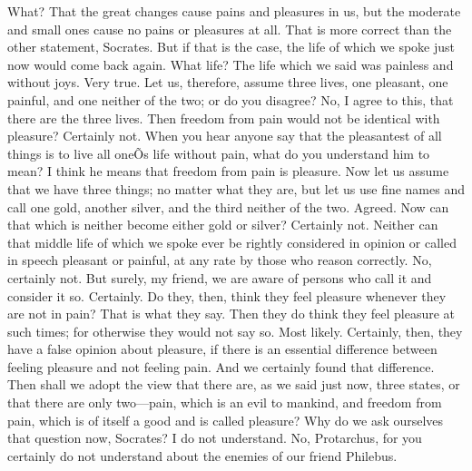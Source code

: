 \documentclass[letterpaper,12pt]{article}
\newcommand{\stephpag}[1]{\marginnote{\small\itshape\fontfamily{ppl}\selectfont #1}}
\begin{document}
\begin{drama}
\protarchusspeaks
What?
\socratesspeaks
That the great changes cause pains and pleasures in us, but the moderate and small ones cause no pains or pleasures at all.
\protarchusspeaks
That is more correct than the other statement, Socrates.
\socratesspeaks
But if that is the case, the life of which we spoke just now would come back again.
\protarchusspeaks
What life?
\socratesspeaks
The life which we said was painless and without joys.
\protarchusspeaks
Very true.
\socratesspeaks
Let us, therefore, assume three lives, \stephpag{d} one pleasant, one painful, and one neither of the two; or do you disagree?
\protarchusspeaks
No, I agree to this, that there are the three lives.
\socratesspeaks
Then freedom from pain would not be identical with pleasure?
\protarchusspeaks
Certainly not.
\socratesspeaks
When you hear anyone say that the pleasantest of all things is to live all oneÕs life without pain, what do you understand him to mean?
\protarchusspeaks
I think he means that freedom from pain is pleasure.
\socratesspeaks
Now let us assume that we have three things; no matter what they are, \stephpag{e} but let us use fine names and call one gold, another silver, and the third neither of the two.
\protarchusspeaks
Agreed.
\socratesspeaks
Now can that which is neither become either gold or silver?
\protarchusspeaks
Certainly not.
\socratesspeaks
Neither can that middle life of which we spoke ever be rightly considered in opinion or called in speech pleasant or painful, at any rate by those who reason correctly.
\protarchusspeaks
No, certainly not.
\socratesspeaks
But surely, my friend, we are aware of persons who call it \stephpag{44 a} and consider it so.
\protarchusspeaks
Certainly.
\socratesspeaks
Do they, then, think they feel pleasure whenever they are not in pain?
\protarchusspeaks
That is what they say.
\socratesspeaks
Then they do think they feel pleasure at such times; for otherwise they would not say so.
\protarchusspeaks
Most likely.
\socratesspeaks
Certainly, then, they have a false opinion about pleasure, if there is an essential difference between feeling pleasure and not feeling pain.
\protarchusspeaks
And we certainly found that difference.
\socratesspeaks
Then shall we adopt the view that there are, \stephpag{b} as we said just now, three states, or that there are only two---pain, which is an evil to mankind, and freedom from pain, which is of itself a good and is called pleasure?
\protarchusspeaks
Why do we ask ourselves that question now, Socrates? I do not understand.
\socratesspeaks
No, Protarchus, for you certainly do not understand about the enemies of our friend Philebus.

\end{drama}
\end{document}
